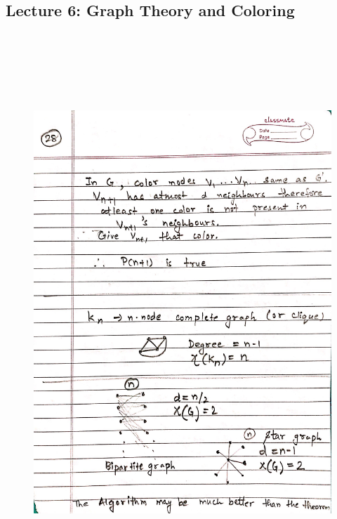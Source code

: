 \newpage
{\color{black} \subsection*{Lecture 6: Graph Theory and Coloring}}
\begin{figure}[H]
    \centering
    \includegraphics[width=16cm, height=21cm]{"./MIT-6.042J/MIT-6042J-028"}
\end{figure}


